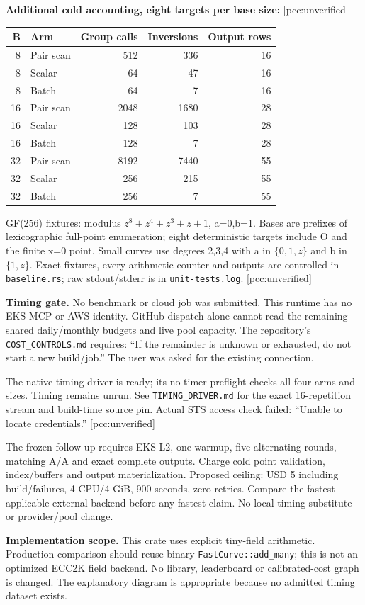 \documentclass[10pt]{article}
\begin{document}
\textbf{Additional cold accounting, eight targets per base size:} [pcc:unverified]
\begin{center}\begin{tabular}{rlrrr}
B&Arm&Group calls&Inversions&Output rows\\\hline
8&Pair scan&512&336&16\\
8&Scalar&64&47&16\\
8&Batch&64&7&16\\
16&Pair scan&2048&1680&28\\
16&Scalar&128&103&28\\
16&Batch&128&7&28\\
32&Pair scan&8192&7440&55\\
32&Scalar&256&215&55\\
32&Batch&256&7&55
\end{tabular}\end{center}
GF(256) fixtures: modulus $z^8+z^4+z^3+z+1$, a=0,b=1. Bases are prefixes of lexicographic full-point enumeration; eight deterministic targets include O and the finite x=0 point. Small curves use degrees 2,3,4 with a in $\{0,1,z\}$ and b in $\{1,z\}$. Exact fixtures, every arithmetic counter and outputs are controlled in \texttt{baseline.rs}; raw stdout/stderr is in \texttt{unit-tests.log}. [pcc:unverified]

\textbf{Timing gate.} No benchmark or cloud job was submitted. This runtime has no EKS MCP or AWS identity. GitHub dispatch alone cannot read the remaining shared daily/monthly budgets and live pool capacity. The repository's \texttt{COST\_CONTROLS.md} requires: ``If the remainder is unknown or exhausted, do not start a new build/job.'' The user was asked for the existing connection.

The native timing driver is ready; its no-timer preflight checks all four arms and sizes. Timing remains unrun. See \texttt{TIMING\_DRIVER.md} for the exact 16-repetition stream and build-time source pin. Actual STS access check failed: ``Unable to locate credentials.'' [pcc:unverified]

The frozen follow-up requires EKS L2, one warmup, five alternating rounds, matching A/A and exact complete outputs. Charge cold point validation, index/buffers and output materialization. Proposed ceiling: USD 5 including build/failures, 4 CPU/4 GiB, 900 seconds, zero retries. Compare the fastest applicable external backend before any fastest claim. No local-timing substitute or provider/pool change.

\textbf{Implementation scope.} This crate uses explicit tiny-field arithmetic. Production comparison should reuse binary \texttt{FastCurve::add\_many}; this is not an optimized ECC2K field backend. No library, leaderboard or calibrated-cost graph is changed. The explanatory diagram is appropriate because no admitted timing dataset exists.
\end{document}
